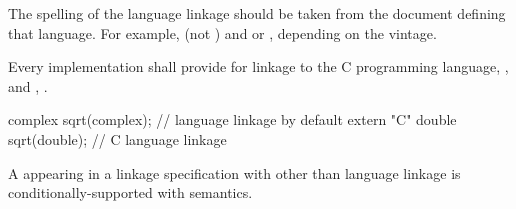 \recommended
The spelling of the language linkage should be taken
from the document defining that language.
For example,  (not ) and
 or , depending on the vintage.

\pnum
{}%
Every implementation shall provide for linkage to the C programming language,
%
, and \Cpp{}, .
\begin{example}
\begin{codeblock}
complex sqrt(complex);          // \Cpp{} language linkage by default
extern "C" {
  double sqrt(double);          // C language linkage
}
\end{codeblock}
\end{example}

\pnum
A  appearing in
a linkage specification with other than \Cpp{} language linkage
is conditionally-supported with
 semantics.

